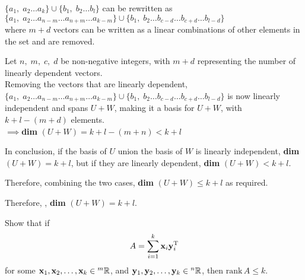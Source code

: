 \documentclass[10pt]{article}
\newcommand{\noin}{\noindent}
\begin{document}
{{{{\begin{spacing}{1.5}
    \vspace{-25pt}
    \begin{spacing}{1}
    \end{spacing}
    \begin{center}
    \begin{spacing}{1}
    \end{spacing}
    $\{a_1,\;a_2\dots a_k\}\cup \{b_1,\;b_2\dots b_l\}$ can be rewritten as $\{a_1,\;a_2\dots a_{n-m}\dots a_{n+m}\dots a_{k-m}\}\cup \{b_1,\;b_2\dots b_{c-d}\dots b_{c+d}\dots b_{l-d}\}$\\
    where $m+d$ vectors can be written as a linear combinations of other elements in the set and are removed.\\
    \begin{spacing}{3}
    \end{spacing}
    Let $n,\;m,\;c,\;d$ be non-negative integers, with $m+d$ representing the number of linearly dependent vectors.\\
    Removing the vectors that are linearly dependent, $\{a_1,\;a_2\dots a_{n-m}\dots a_{n+m}\dots a_{k-m}\}\cup \{b_1,\;b_2\dots b_{c-d}\dots b_{c+d}\dots b_{l-d}\}$ is now linearly independent and spans $U+W$, making it a basis for $U+W$, with $k+l-(m+d)$ elements.\\
    $\implies$\textbf{dim} $(U+W)=k+l-(m+n)<k+l$\\
    \begin{spacing}{3}
    \end{spacing}
    In conclusion, if the basis of $U$ union the basis of $W$ is linearly independent, \textbf{dim} $(U+W)=k+l$, but if they are linearly dependent,  \textbf{dim} $(U+W)<k+l$. \\
    \begin{spacing}{3}
    \end{spacing}
    Therefore, combining the two cases, \textbf{dim} $(U+W)\leq k+l$ as required.
    \begin{spacing}{3}
    \end{spacing}
    Therefore, , \textbf{dim} $(U+W)=k+l.$
    \end{center}
    \end{spacing}
     \begin{spacing}{3}
     \end{spacing}
	}
}

\pagebreak

\noin{\bf 4.}  Show that if 
$$A=\sum_{i=1}^k {\bf x}_i{\bf y}_i^{\mathrm{T}}$$
for some ${\bf x}_1, {\bf x}_2, \dots, {\bf x}_k \in {^m}\mathbb R$, and ${\bf y}_1, {\bf y}_2, \dots, {\bf y}_k \in {^n}\mathbb R$, then $\mathrm{rank}\, A \leq k$.\\



}}
\end{document}
